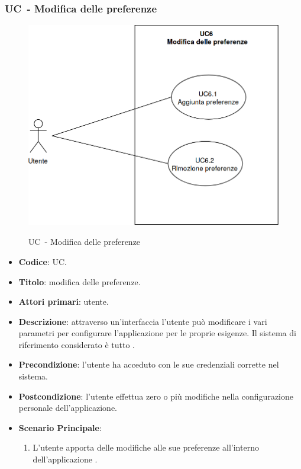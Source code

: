\subsubsection{UC\theuccount\ - Modifica delle preferenze}
	\begin{figure}[H]
		\centering
		\includegraphics[width=\columnwidth]{img/UC6.png}\\
		\caption{UC\theuccount\ - Modifica delle preferenze}
	\end{figure}
	\begin{itemize}
		\item \textbf{Codice}: UC\theuccount.
		\item \textbf{Titolo}: modifica delle preferenze.
		\item \textbf{Attori primari}: utente.
		\item \textbf{Descrizione}: attraverso un'interfaccia l'utente può modificare i vari parametri per configurare l'applicazione per le proprie esigenze. Il sistema di riferimento considerato è tutto \progetto.
		\item \textbf{Precondizione}: l'utente ha acceduto con le sue credenziali corrette nel sistema.
		\item \textbf{Postcondizione}: l'utente effettua zero o più modifiche nella configurazione personale dell'applicazione. 
		\item \textbf{Scenario Principale}:
		\begin{enumerate}
			\item L'utente apporta delle modifiche alle sue preferenze all'interno dell'applicazione \progetto.
		\end{enumerate}
	\end{itemize}



